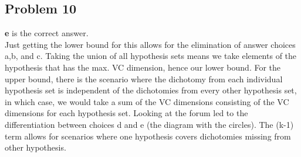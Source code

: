 \documentclass[12 pt]{article}
\begin{document}
	
	\subsection*{Problem 10}
	\textbf{e} is the correct answer. \\
	Just getting the lower bound for this allows for the elimination of answer choices a,b, and c. Taking the union of all hypothesis sets means we take elements of the hypothesis that has the max. VC dimension, hence our lower bound. For the upper bound, there is the scenario where the dichotomy from each individual hypothesis set is independent of the dichotomies from every other hypothesis set, in which case, we would take a sum of the VC dimensions consisting of the VC dimensions for each hypothesis set. Looking at the forum led to the differentiation between choices d and e (the diagram with the circles). The (k-1) term allows for scenarios where one hypothesis covers dichotomies missing from other hypothesis. 
	
\end{document}
